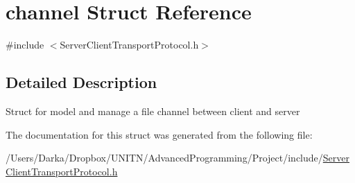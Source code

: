 \hypertarget{structchannel}{}\section{channel Struct Reference}
\label{structchannel}


{\ttfamily \#include $<$Server\+Client\+Transport\+Protocol.\+h$>$}



\subsection{Detailed Description}
Struct for model and manage a file channel between client and server 

The documentation for this struct was generated from the following file\+:\begin{DoxyCompactItemize}
\item 
/\+Users/\+Darka/\+Dropbox/\+U\+N\+I\+T\+N/\+Advanced\+Programming/\+Project/include/\hyperlink{_server_client_transport_protocol_8h}{Server\+Client\+Transport\+Protocol.\+h}\end{DoxyCompactItemize}
